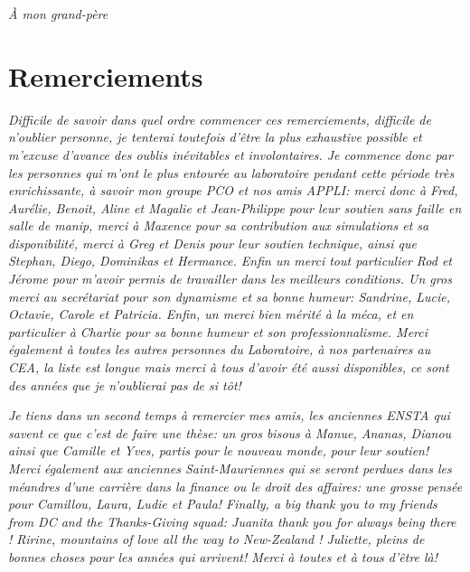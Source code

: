 \documentclass[a4paper,12pt,french]{report}
\begin{document}

\clearpage
%
%

\clearpage

\vspace{5cm}
\thispagestyle{empty}
\begin{center}
\textit{À mon grand-père}
\end{center}

%
\chapter*{Remerciements}
\thispagestyle{empty}
\begin{center}
\textit{
Difficile de savoir dans quel ordre commencer ces remerciements, difficile de n'oublier personne, je tenterai toutefois d'être la plus exhaustive possible et m'excuse d'avance des oublis inévitables et involontaires. Je commence donc par les personnes qui m'ont le plus entourée au laboratoire pendant cette période très enrichissante, à savoir mon groupe PCO et nos amis APPLI: merci donc à Fred, Aurélie, Benoit, Aline et Magalie et Jean-Philippe pour leur soutien sans faille en salle de manip, merci à Maxence pour sa contribution aux simulations et sa disponibilité, merci à Greg et Denis pour leur soutien technique, ainsi que Stephan, Diego, Dominikas et Hermance. Enfin un merci tout particulier Rod et Jérome pour m'avoir permis de travailler dans les meilleurs conditions. Un gros merci au secrétariat pour son dynamisme et sa bonne humeur: Sandrine, Lucie, Octavie, Carole et Patricia. Enfin, un merci bien mérité à la méca, et en particulier à Charlie pour sa bonne humeur et son professionnalisme. Merci également à toutes les autres personnes du Laboratoire, à nos partenaires au CEA, la liste est longue mais merci à tous d'avoir été aussi disponibles, ce sont des années que je n'oublierai pas de si tôt!}\\
\end{center}
\begin{center}
\textit{Je tiens dans un second temps à remercier mes amis, les anciennes ENSTA qui savent ce que c'est de faire une thèse: un gros bisous à Manue, Ananas, Dianou ainsi que Camille et Yves, partis pour le nouveau monde, pour leur soutien! Merci également aux anciennes Saint-Mauriennes qui se seront perdues dans les méandres d'une carrière dans la finance ou le droit des affaires: une grosse pensée pour Camillou, Laura, Ludie et Paula! Finally, a big thank you to my friends from DC and the Thanks-Giving squad: Juanita thank you for always being there ! Ririne, mountains of love all the way to New-Zealand ! Juliette, pleins de bonnes choses pour les années qui arrivent! Merci à toutes et à tous d'être là!}
\end{center}
\end{document}
